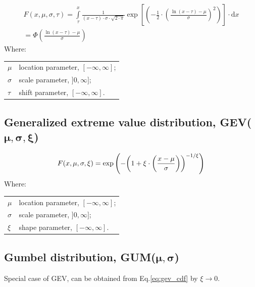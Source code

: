 \begin{multline}   
   F(x,\mu ,\sigma ,\tau ) = \int\limits_\tau ^x {\frac{1}{{\left( {x - \tau } \right) \cdot \sigma  \cdot \sqrt {2 \cdot \pi } }}} \exp \left[ {\left( { - \frac{1}{2} \cdot {{\left( {\frac{{\ln \left( {x - \tau } \right) - \mu }}{\sigma }} \right)}^2}} \right)} \right] \cdot \mathrm{d}x \\ = \Phi \left( {\frac{{\ln \left( {x - \tau } \right) - \mu }}{\sigma }} \right)
\end{multline}
Where:

\begin{tabular}{ll}
	$\mu$ & location parameter, $[-\infty, \infty]$; \\
	$\sigma$ & scale parameter, $]0, \infty]$; \\
	$\tau$ & shift parameter, $[-\infty, \infty]$.
\end{tabular}

\subsection*{Generalized extreme value distribution, GEV($\boldsymbol{\mu,\sigma,\xi}$)}

\begin{equation} \label{eq:gev_cdf}
	F(x,\mu ,\sigma ,\xi ) = \exp \left( { - {{\left( {1 + \xi  \cdot \left( {\frac{{x - \mu }}{\sigma }} \right)} \right)}^{{{ - 1} \mathord{\left/
						{\vphantom {{ - 1} \xi }} \right.
						\kern-\nulldelimiterspace} \xi }}}} \right)
\end{equation}	
Where:

\begin{tabular}{ll}
	$\mu$ & location parameter, $[-\infty, \infty]$; \\
	$\sigma$ & scale parameter, $]0, \infty]$; \\
	$\xi$ & shape parameter, $[-\infty, \infty]$.
\end{tabular}

\subsection*{Gumbel distribution, GUM($\boldsymbol{\mu,\sigma}$)}

Special case of GEV, can be obtained from Eq.\ref{eq:gev_cdf} by $\xi \to 0$.


